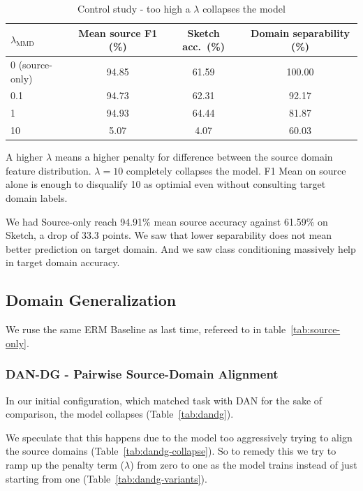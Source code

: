 \documentclass{article}
\begin{document}
\begin{table}[tb]
  \caption{Control study - too high a $\lambda$ collapses the model}
  \label{tab:t2-study-compact}
  \centering
  \footnotesize
  \begin{tabular}{lccc}
    \toprule
    $\lambda_{\mathrm{MMD}}$ & Mean source F1 (\%) & Sketch acc.\ (\%) & Domain separability (\%) \\
    \midrule
    0 (source-only) & 94.85 & 61.59 & 100.00 \\
    0.1             & 94.73 & 62.31 &  92.17 \\
    1               & 94.93 & 64.44 &  81.87 \\
    10              &  5.07 &  4.07 &  60.03 \\
    \bottomrule
  \end{tabular}
\end{table}

A higher $\lambda$ means a higher penalty for difference between the source domain feature distribution.  $\lambda = 10$ completely collapses the model. F1 Mean on source alone is enough to disqualify 10 as optimial even without
consulting target domain labels.

We had Source-only reach 94.91\% mean source accuracy against 61.59\% on Sketch, a drop of 33.3 points. We saw that lower separability does not mean better prediction on target domain. And we saw class conditioning massively help
in target domain accuracy.
\subsection{Domain Generalization}

We ruse the same ERM Baseline as last time, refereed to in table~\ref{tab:source-only}.

\subsubsection{DAN-DG - Pairwise Source-Domain Alignment}

In our initial configuration, which matched task with DAN for the sake of comparison, the model collapses (Table~\ref{tab:dandg}).


We speculate that this happens due to the model too aggressively trying to align the source domains (Table~\ref{tab:dandg-collapse}). So to remedy this we try
to ramp up the penalty term ($\lambda$) from zero to one as the model trains instead of just starting from one (Table~\ref{tab:dandg-variants}).
\end{document}
